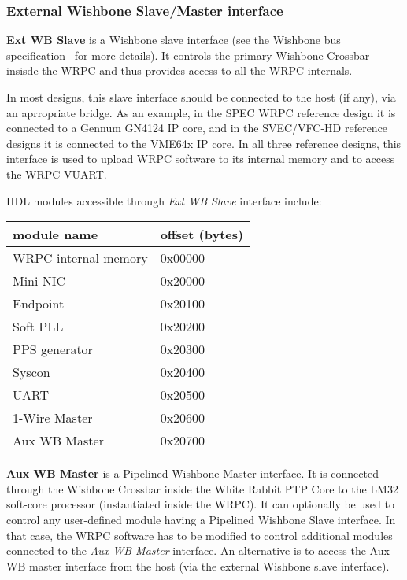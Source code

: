 \subsubsection{External Wishbone Slave/Master interface}
\label{sec:wrpc_wb}


{\bf Ext WB Slave} is a Wishbone slave interface (see the Wishbone bus specification~\cite{wb_spec}
for more details). It controls the primary Wishbone Crossbar insisde the WRPC and thus provides
access to all the WRPC internals.

In most designs, this slave interface should be connected to the host (if any), via an aprropriate
bridge. As an example, in the SPEC WRPC reference design it is connected to a Gennum GN4124 IP core,
and in the SVEC/VFC-HD reference designs it is connected to the VME64x IP core.  In all three
reference designs, this interface is used to upload WRPC software to its internal memory and to
access the WRPC VUART.

HDL modules accessible through \emph{Ext WB Slave} interface include:
\begin{center}
  \begin{tabular}{|l|l|}
    \hline {\bf module name} & {\bf offset (bytes)}\\
    \hline
    WRPC internal memory & 0x00000\\
                Mini NIC & 0x20000\\
                Endpoint & 0x20100\\
                Soft PLL & 0x20200\\
           PPS generator & 0x20300\\
                  Syscon & 0x20400\\
                    UART & 0x20500\\
           1-Wire Master & 0x20600\\
           Aux WB Master & 0x20700\\
    \hline
  \end{tabular}
\end{center}

{\bf Aux WB Master} is a Pipelined Wishbone Master interface. It is connected through the Wishbone
Crossbar inside the White Rabbit PTP Core to the LM32 soft-core processor (instantiated inside the
WRPC). It can optionally be used to control any user-defined module having a Pipelined Wishbone
Slave interface. In that case, the WRPC software has to be modified to control additional modules
connected to the \emph{Aux WB Master} interface. An alternative is to access the Aux WB master
interface from the host (via the external Wishbone slave interface).

